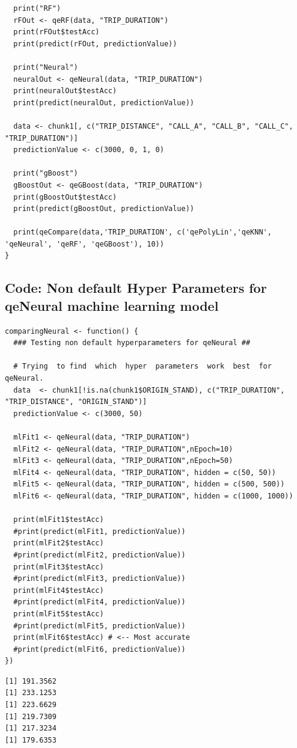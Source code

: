 \documentclass{article}
\numberwithin{equation}{section}
\begin{document}
\begin{lstlisting}
  print("RF")
  rFOut <- qeRF(data, "TRIP_DURATION")
  print(rFOut$testAcc)
  print(predict(rFOut, predictionValue))

  print("Neural")
  neuralOut <- qeNeural(data, "TRIP_DURATION")
  print(neuralOut$testAcc)
  print(predict(neuralOut, predictionValue))
  
  data <- chunk1[, c("TRIP_DISTANCE", "CALL_A", "CALL_B", "CALL_C", "TRIP_DURATION")]
  predictionValue <- c(3000, 0, 1, 0)
  
  print("gBoost")
  gBoostOut <- qeGBoost(data, "TRIP_DURATION")
  print(gBoostOut$testAcc)
  print(predict(gBoostOut, predictionValue))
  
  print(qeCompare(data,'TRIP_DURATION', c('qePolyLin','qeKNN', 'qeNeural', 'qeRF', 'qeGBoost'), 10))
}
\end{lstlisting}

\subsection{Code: Non default Hyper Parameters for qeNeural machine learning model}
\begin{lstlisting}
comparingNeural <- function() {
  ### Testing non default hyperparameters for qeNeural ##

  # Trying  to find  which  hyper  parameters  work  best  for  qeNeural.
  data  <- chunk1[!is.na(chunk1$ORIGIN_STAND), c("TRIP_DURATION", "TRIP_DISTANCE", "ORIGIN_STAND")]
  predictionValue <- c(3000, 50)
  
  mlFit1 <- qeNeural(data, "TRIP_DURATION")
  mlFit2 <- qeNeural(data, "TRIP_DURATION",nEpoch=10)
  mlFit3 <- qeNeural(data, "TRIP_DURATION",nEpoch=50)
  mlFit4 <- qeNeural(data, "TRIP_DURATION", hidden = c(50, 50))
  mlFit5 <- qeNeural(data, "TRIP_DURATION", hidden = c(500, 500))
  mlFit6 <- qeNeural(data, "TRIP_DURATION", hidden = c(1000, 1000))
  
  print(mlFit1$testAcc)
  #print(predict(mlFit1, predictionValue))
  print(mlFit2$testAcc)
  #print(predict(mlFit2, predictionValue))
  print(mlFit3$testAcc)
  #print(predict(mlFit3, predictionValue))
  print(mlFit4$testAcc)
  #print(predict(mlFit4, predictionValue))
  print(mlFit5$testAcc)
  #print(predict(mlFit5, predictionValue))
  print(mlFit6$testAcc) # <-- Most accurate
  #print(predict(mlFit6, predictionValue)) 
})
\end{lstlisting}
\begin{verbatim}
[1] 191.3562
[1] 233.1253
[1] 223.6629
[1] 219.7309
[1] 217.3234
[1] 179.6353
\end{verbatim}
\end{document}
